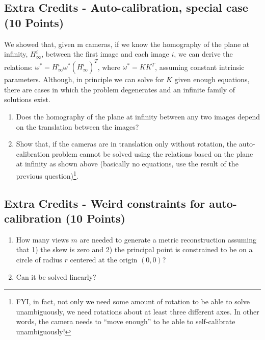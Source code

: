 \documentclass[11pt]{article}
\begin{document}
\subsection{Extra Credits - Auto-calibration, special case (10 Points)}
We showed that, given m cameras, if we know the homography of the plane
at infinity, $H^i_\infty$, between the first image and each image $i$, we can derive
the relations: $\omega^* = H^i_\infty \omega^* (H^i_\infty)^T$, where $\omega^* = KK^T $, assuming constant
intrinsic parameters. Although, in principle we can solve for $K$ given enough
equations, there are cases in which the problem degenerates and an infinite
family of solutions exist.
\begin{enumerate}
\item Does the homography of the plane at infinity between any two images
depend on the translation between the images?
\item Show that, if the cameras are in translation only without rotation, the
auto-calibration problem cannot be solved using the relations based
on the plane at infinity as shown above (basically no equations, use
the result of the previous question)\footnote{FYI, in fact, not only we need some amount of rotation to be able to solve unambiguously, we need rotations about at least three different axes. In other words, the camera
needs to ``move enough'' to be able to self-calibrate unambiguously!}.
\end{enumerate}

\subsection{Extra Credits - Weird constraints for auto-calibration (10 Points)}
\begin{enumerate}
\item How many views $m$ are needed to generate a metric reconstruction assuming that 1) the skew is zero and 2) the
principal point is constrained to be on a circle of radius $r$ centered at the origin $(0,0)$?
\item Can it be solved linearly?
\end{enumerate}
\end{document}
